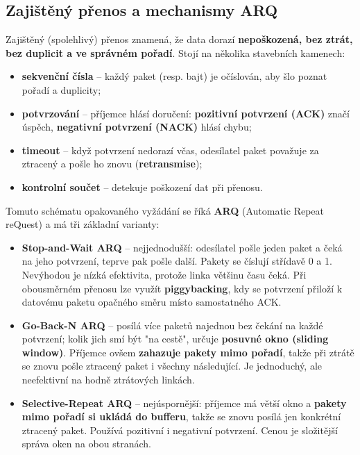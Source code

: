 \documentclass[11pt,a4paper]{article}
\begin{document}
\subsection*{Zajištěný přenos a mechanismy ARQ}
Zajištěný (spolehlivý) přenos znamená, že data dorazí \textbf{nepoškozená, bez ztrát, bez duplicit a ve správném pořadí}. Stojí na několika stavebních kamenech:
\begin{itemize}
  \item \textbf{sekvenční čísla} -- každý paket (resp. bajt) je očíslován, aby šlo poznat pořadí a duplicity;
  \item \textbf{potvrzování} -- příjemce hlásí doručení: \textbf{pozitivní potvrzení (ACK)} značí úspěch, \textbf{negativní potvrzení (NACK)} hlásí chybu;
  \item \textbf{timeout} -- když potvrzení nedorazí včas, odesílatel paket považuje za ztracený a pošle ho znovu (\textbf{retransmise});
  \item \textbf{kontrolní součet} -- detekuje poškození dat při přenosu.
\end{itemize}
Tomuto schématu opakovaného vyžádání se říká \textbf{ARQ} (Automatic Repeat reQuest) a má tři základní varianty:
\begin{itemize}
  \item \textbf{Stop-and-Wait ARQ} -- nejjednodušší: odesílatel pošle jeden paket a čeká na jeho potvrzení, teprve pak pošle další. Pakety se číslují střídavě 0 a 1. Nevýhodou je nízká efektivita, protože linka většinu času čeká. Při obousměrném přenosu lze využít \textbf{piggybacking}, kdy se potvrzení přiloží k datovému paketu opačného směru místo samostatného ACK.
  \item \textbf{Go-Back-N ARQ} -- posílá více paketů najednou bez čekání na každé potvrzení; kolik jich smí být "na cestě", určuje \textbf{posuvné okno (sliding window)}. Příjemce ovšem \textbf{zahazuje pakety mimo pořadí}, takže při ztrátě se znovu pošle ztracený paket i všechny následující. Je jednoduchý, ale neefektivní na hodně ztrátových linkách.
  \item \textbf{Selective-Repeat ARQ} -- nejúspornější: příjemce má větší okno a \textbf{pakety mimo pořadí si ukládá do bufferu}, takže se znovu posílá jen konkrétní ztracený paket. Používá pozitivní i negativní potvrzení. Cenou je složitější správa oken na obou stranách.
\end{itemize}
\end{document}
